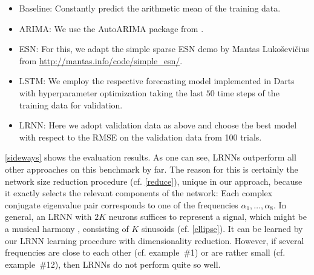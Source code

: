 \documentclass[twoside,11pt]{article}
\theoremstyle{definition}
\begin{document}
\begin{itemize}
  \item Baseline: Constantly predict the arithmetic mean of the training data.
  \item ARIMA: We use the AutoARIMA package from \citet{HK08}.
  \item ESN: For this, we adapt the simple sparse ESN demo by Mantas
	Luko\v{s}evi\v{c}ius from \url{http://mantas.info/code/simple_esn/}.
  \item LSTM: We employ the respective forecasting model implemented in Darts
	with hyperparameter optimization taking the last $50$ time steps of the
	training data for validation.
  \item LRNN: Here we adopt validation data as above and choose the best model
	with respect to the RMSE on the validation data from 100 trials.
\end{itemize}

\cref{sideways} shows the evaluation results. As one can see, LRNNs outperform
all other approaches on this benchmark by far. The reason for this is certainly
the network size reduction procedure (cf. \cref{reduce}), unique in our approach,
because it exactly selects the relevant components of the network: Each complex
conjugate
eigenvalue pair corresponds to one of the frequencies $\alpha_1,\dots,\alpha_8$.
In general, an LRNN with $2K$ neurons suffices to represent a signal, which
might be a musical harmony \citep{Sto17b}, consisting of $K$ sinusoids (cf.
\cref{ellipse}). It can be learned by our LRNN learning procedure with
dimensionality reduction. However, if several frequencies are close to each
other (cf. example~\#1) or are rather small (cf. example~\#12), then LRNNs do
not perform quite so well.
	
\end{document}
